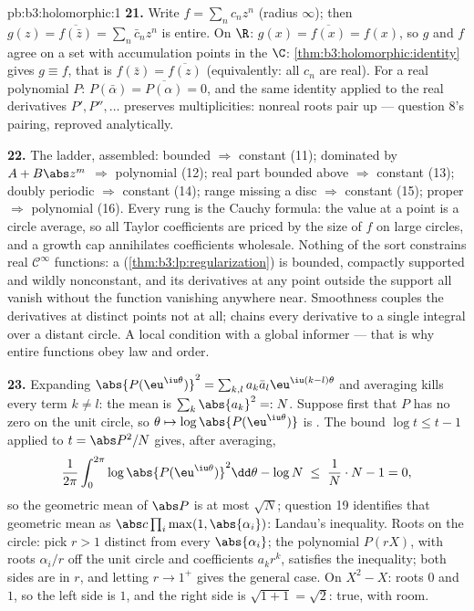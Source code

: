 \begin{solution}{pb:b3:holomorphic:1}
\textbf{21.} Write $f = \sum_nc_nz^n$ (radius $\infty$);
then $g(z) = \overline{f(\bar z)} = \sum_n\bar c_nz^n$ is
entire. On $\R$: $g(x) = \overline{f(x)} = f(x)$, so $g$ and
$f$ agree on a set with accumulation points in the 
$\C$: \cref{thm:b3:holomorphic:identity} gives $g \equiv f$,
that is $f(\bar z) = \overline{f(z)}$ (equivalently: all
$c_n$ are real). For a real polynomial $P$:
$P(\bar\alpha) = \overline{P(\alpha)} = 0$, and the same
identity applied to the real derivatives $P', P'', \dots$
preserves multiplicities: nonreal roots pair up ---
question 8's pairing, reproved analytically.

\textbf{22.} The ladder, assembled: bounded $\Rightarrow$
constant (11); dominated by $A + B\abs z^m$ $\Rightarrow$
polynomial (12); real part bounded above $\Rightarrow$
constant (13); doubly periodic $\Rightarrow$ constant (14);
range missing a disc $\Rightarrow$ constant (15); proper
$\Rightarrow$ polynomial (16). Every rung is the Cauchy
formula: the value at a point is a circle average, so all
Taylor coefficients are priced by the size of $f$ on large
circles, and a growth cap annihilates coefficients
wholesale. Nothing of the sort constrains real $\mathcal
C^\infty$ functions: a 
(\cref{thm:b3:lp:regularization}) is bounded, compactly
supported and wildly nonconstant, and its derivatives at any
point outside the support all vanish without the function
vanishing anywhere near. Smoothness couples the derivatives
at distinct points not at all;  chains every
derivative to a single integral over a distant circle. A
local condition with a global informer --- that is why
entire functions obey law and order.

\textbf{23.} Expanding
$\abs{P(\eu^{\iu\theta})}^2 = \sum_{k,l}a_k\bar a_l
\eu^{\iu(k-l)\theta}$ and averaging kills every term $k \neq
l$: the mean is $\sum_k\abs{a_k}^2 =: N$. Suppose first that
$P$ has no zero on the unit circle, so $\theta \mapsto
\log\abs{P(\eu^{\iu\theta})}$ is . The bound $\log
t \leq t - 1$ applied to $t = \abs P^2/N$ gives, after
averaging,
\[
\frac1{2\pi}\int_0^{2\pi}\log\abs{P(\eu^{\iu\theta})}^2
\dd\theta - \log N
\;\leq\; \frac1N\cdot N - 1 = 0,
\]
so the geometric mean of $\abs P$ is at most $\sqrt N$;
question 19 identifies that geometric mean as
$\abs c\prod_i\max(1, \abs{\alpha_i})$: Landau's
inequality. Roots on the circle: pick $r > 1$ distinct from
every $\abs{\alpha_i}$; the polynomial $P(rX)$, with roots
$\alpha_i/r$ off the unit circle and coefficients $a_kr^k$,
satisfies the inequality; both sides are  in $r$,
and letting $r \to 1^+$ gives the general case. On $X^2 -
X$: roots $0$ and $1$, so the left side is $1$, and the
right side is $\sqrt{1 + 1} = \sqrt2$: true, with room.


\end{solution}
